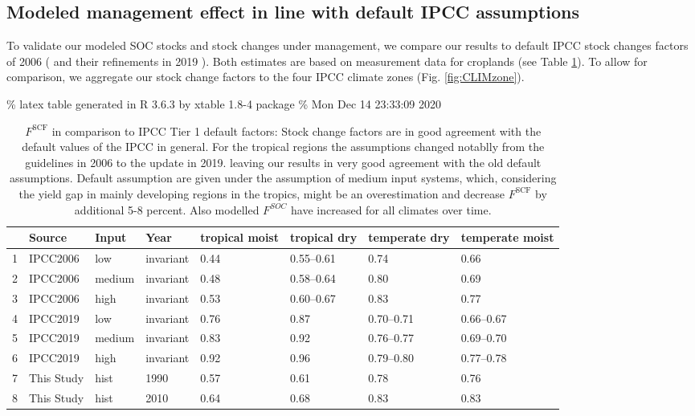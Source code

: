 \documentclass[gc, manuscript]{copernicus}
\begin{document}
\hypertarget{sec:ipcccompare}{%
\subsection{Modeled management effect in line with default IPCC assumptions}\label{sec:ipcccompare}}

To validate our modeled SOC stocks and stock changes under management, we compare our results to default IPCC stock changes factors of 2006 (\citep{eggleston_ipcc_2006} and their refinements in 2019 \citep{calvo_buendia_ipcc_2019}). Both estimates are based on measurement data for croplands (see Table \ref{tab:SCFglo}). To allow for comparison, we aggregate our stock change factors to the four IPCC climate zones (Fig. \ref{fig:CLIMzone}).

\% latex table generated in R 3.6.3 by xtable 1.8-4 package
\% Mon Dec 14 23:33:09 2020

\begin{table}[ht]
\centering
\begin{tabular}{rlllllll}
  \hline
 & Source & Input & Year & tropical moist & tropical dry & temperate dry & temperate moist \\ 
  \hline
1 & IPCC2006 & low & invariant & 0.44 & 0.55--0.61 & 0.74 & 0.66 \\ 
  2 & IPCC2006 & medium & invariant & 0.48 & 0.58--0.64 & 0.80 & 0.69 \\ 
  3 & IPCC2006 & high & invariant & 0.53 & 0.60--0.67 & 0.83 & 0.77 \\ 
  4 & IPCC2019 & low & invariant & 0.76 & 0.87 & 0.70--0.71 & 0.66--0.67 \\ 
  5 & IPCC2019 & medium & invariant & 0.83 & 0.92 & 0.76--0.77 & 0.69--0.70 \\ 
  6 & IPCC2019 & high & invariant & 0.92 & 0.96 & 0.79--0.80 & 0.77--0.78 \\ 
  7 & This Study & hist & 1990 & 0.57 & 0.61 & 0.78 & 0.76 \\ 
  8 & This Study & hist & 2010 & 0.64 & 0.68 & 0.83 & 0.83 \\ 
   \hline
\end{tabular}
\caption{$F^{\mathrm{SCF}}$ in comparison to IPCC Tier 1 default factors: Stock change factors are in good agreement with the default values of the IPCC in general. For the tropical regions the assumptions changed notablly from the guidelines in 2006 to the update in 2019. leaving our results in very good agreement with the old default assumptions. Default assumption are given under the assumption of medium input systems, which, considering the yield gap in mainly developing regions in the tropics, might be an overestimation and decrease $F^{\mathrm{SCF}}$ by additional 5-8 percent. Also modelled $F^{SOC}$ have increased for all climates over time.} 
\label{tab:SCFglo}
\end{table}
\end{document}
